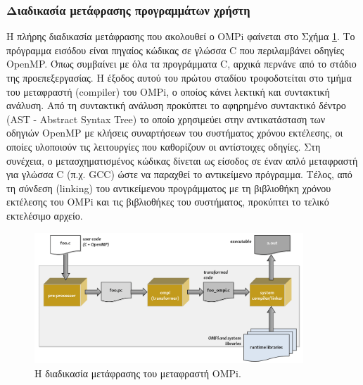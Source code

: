
\subsubsection{Διαδικασία μετάφρασης προγραμμάτων χρήστη}
Η πλήρης διαδικασία μετάφρασης που ακολουθεί ο OMPi φαίνεται στο Σχήμα \ref{fig:ompi-translation}. Το πρόγραμμα εισόδου είναι πηγαίος κώδικας σε γλώσσα C που περιλαμβάνει οδηγίες OpenMP. Όπως συμβαίνει με όλα τα προγράμματα C, αρχικά περνάνε από το στάδιο της προεπεξεργασίας. Η έξοδος αυτού του πρώτου σταδίου τροφοδοτείται στο τμήμα του μεταφραστή (compiler) του OMPi, ο οποίος κάνει λεκτική και συντακτική ανάλυση. Από τη συντακτική ανάλυση προκύπτει το αφηρημένο συντακτικό δέντρο (AST - Abstract Syntax Tree) το οποίο χρησιμεύει στην αντικατάσταση των οδηγιών OpenMP με κλήσεις συναρτήσεων του συστήματος χρόνου εκτέλεσης, οι οποίες υλοποιούν τις λειτουργίες που καθορίζουν οι αντίστοιχες οδηγίες. Στη συνέχεια, ο μετασχηματισμένος κώδικας δίνεται ως είσοδος σε έναν απλό μεταφραστή για γλώσσα C (π.χ. GCC) ώστε να παραχθεί το αντικείμενο πρόγραμμα. Τέλος, από τη σύνδεση (linking) του αντικείμενου προγράμματος με τη βιβλιοθήκη χρόνου εκτέλεσης του OMPi και τις βιβλιοθήκες του συστήματος, προκύπτει το τελικό εκτελέσιμο αρχείο.

\begin{figure}[t]
	\centering
	\includegraphics[width=0.9\textwidth]{Figures/ompi-translation.png}
	\linebreak 
	\caption{Η διαδικασία μετάφρασης του μεταφραστή OMPi.}
	\label{fig:ompi-translation}
\end{figure}

